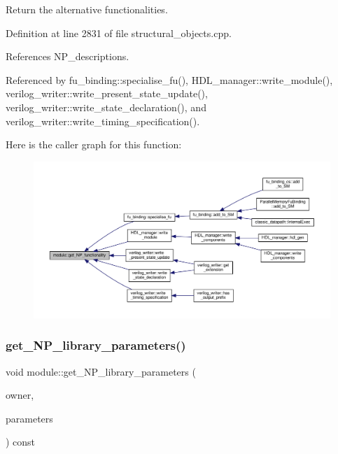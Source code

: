 Return the alternative functionalities. 



Definition at line 2831 of file structural\+\_\+objects.\+cpp.



References N\+P\+\_\+descriptions.



Referenced by fu\+\_\+binding\+::specialise\+\_\+fu(), H\+D\+L\+\_\+manager\+::write\+\_\+module(), verilog\+\_\+writer\+::write\+\_\+present\+\_\+state\+\_\+update(), verilog\+\_\+writer\+::write\+\_\+state\+\_\+declaration(), and verilog\+\_\+writer\+::write\+\_\+timing\+\_\+specification().

Here is the caller graph for this function\+:
\nopagebreak
\begin{figure}[H]
\begin{center}
\leavevmode
\includegraphics[width=350pt]{d0/dd3/classmodule_a9238b0f905edbc784f531f78cf2a78b0_icgraph}
\end{center}
\end{figure}
\mbox{\label{classmodule_aaa6bacd38ef58c41946a993dde301cfc}} 
\subsubsection{\texorpdfstring{get\+\_\+\+N\+P\+\_\+library\+\_\+parameters()}{get\_NP\_library\_parameters()}}
{\footnotesize\ttfamily void module\+::get\+\_\+\+N\+P\+\_\+library\+\_\+parameters (\begin{DoxyParamCaption}\item[{\hyperlink{structural__objects_8hpp_a8ea5f8cc50ab8f4c31e2751074ff60b2}{structural\+\_\+object\+Ref}}]{owner,  }\item[{std\+::vector$<$ std\+::pair$<$ std\+::string, \hyperlink{structural__objects_8hpp_a8ea5f8cc50ab8f4c31e2751074ff60b2}{structural\+\_\+object\+Ref} $>$$>$ \&}]{parameters }\end{DoxyParamCaption}) const}



